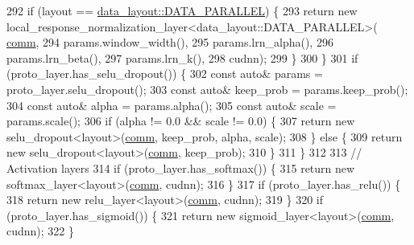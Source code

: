 \begin{DoxyCode}
292     \textcolor{keywordflow}{if} (layout == \hyperlink{base_8hpp_a786677cbfb3f5677b4d84f3056eb08dba37d2a3465f7cbf4ab60f4e79944d0638}{data\_layout::DATA\_PARALLEL}) \{
293       \textcolor{keywordflow}{return} \textcolor{keyword}{new} local\_response\_normalization\_layer<data\_layout::DATA\_PARALLEL>(
      \hyperlink{file__io_8cpp_ab048c6f9fcbcfaa57ce68b00263dbebe}{comm},
294                                                                                 params.window\_width(),
295                                                                                 params.lrn\_alpha(),
296                                                                                 params.lrn\_beta(),
297                                                                                 params.lrn\_k(),
298                                                                                 cudnn);
299     \}
300   \}
301   \textcolor{keywordflow}{if} (proto\_layer.has\_selu\_dropout()) \{
302     \textcolor{keyword}{const} \textcolor{keyword}{auto}& params = proto\_layer.selu\_dropout();
303     \textcolor{keyword}{const} \textcolor{keyword}{auto}& keep\_prob = params.keep\_prob();
304     \textcolor{keyword}{const} \textcolor{keyword}{auto}& alpha = params.alpha();
305     \textcolor{keyword}{const} \textcolor{keyword}{auto}& scale = params.scale();
306     \textcolor{keywordflow}{if} (alpha != 0.0 && scale != 0.0) \{
307       \textcolor{keywordflow}{return} \textcolor{keyword}{new} selu\_dropout<layout>(\hyperlink{file__io_8cpp_ab048c6f9fcbcfaa57ce68b00263dbebe}{comm}, keep\_prob, alpha, scale);
308     \} \textcolor{keywordflow}{else} \{
309       \textcolor{keywordflow}{return} \textcolor{keyword}{new} selu\_dropout<layout>(\hyperlink{file__io_8cpp_ab048c6f9fcbcfaa57ce68b00263dbebe}{comm}, keep\_prob);
310     \}
311   \}
312 
313   \textcolor{comment}{// Activation layers}
314   \textcolor{keywordflow}{if} (proto\_layer.has\_softmax()) \{
315     \textcolor{keywordflow}{return} \textcolor{keyword}{new} softmax\_layer<layout>(\hyperlink{file__io_8cpp_ab048c6f9fcbcfaa57ce68b00263dbebe}{comm}, cudnn);
316   \}
317   \textcolor{keywordflow}{if} (proto\_layer.has\_relu()) \{
318     \textcolor{keywordflow}{return} \textcolor{keyword}{new} relu\_layer<layout>(\hyperlink{file__io_8cpp_ab048c6f9fcbcfaa57ce68b00263dbebe}{comm}, cudnn);
319   \}
320   \textcolor{keywordflow}{if} (proto\_layer.has\_sigmoid()) \{
321     \textcolor{keywordflow}{return} \textcolor{keyword}{new} sigmoid\_layer<layout>(\hyperlink{file__io_8cpp_ab048c6f9fcbcfaa57ce68b00263dbebe}{comm}, cudnn);
322   \}

\end{DoxyCode}
